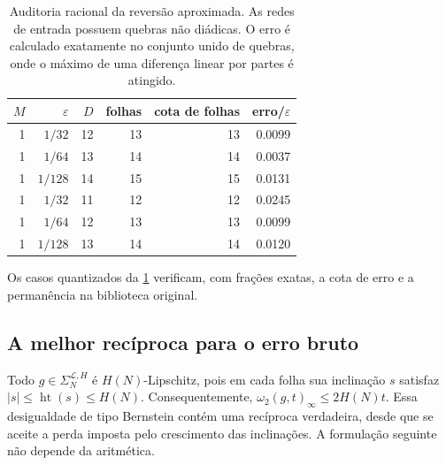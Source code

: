 \documentclass[11pt,a4paper]{article}
\theoremstyle{definition}
\theoremstyle{remark}
\newcommand{\Library}{\mathcal{L}}
\newcommand{\height}{\operatorname{ht}}
\begin{document}
\begin{table}[t]
 \centering
 \small
 \begin{tabular}{rrrrrr}
\toprule
$M$ & $\varepsilon$ & $D$ & folhas & cota de folhas & erro/$\varepsilon$\\
\midrule
1 & $1/32$ & 12 & 13 & 13 & 0.0099\\
1 & $1/64$ & 13 & 14 & 14 & 0.0037\\
1 & $1/128$ & 14 & 15 & 15 & 0.0131\\
1 & $1/32$ & 11 & 12 & 12 & 0.0245\\
1 & $1/64$ & 12 & 13 & 13 & 0.0099\\
1 & $1/128$ & 13 & 14 & 14 & 0.0120\\
\bottomrule
\end{tabular}

 \caption{Auditoria racional da reversão aproximada. As redes de entrada
 possuem quebras não diádicas. O erro é calculado exatamente no conjunto
 unido de quebras, onde o máximo de uma diferença linear por partes é
 atingido.}
 \label{tab:approximate-reverse-audit}
\end{table}

Os casos quantizados da \cref{tab:approximate-reverse-audit} verificam, com
frações exatas, a cota de erro e a permanência na biblioteca original.

\subsection{A melhor recíproca para o erro bruto}

Todo $g\in\Sigma_N^{\Library,H}$ é $H(N)$-Lipschitz, pois em cada folha sua
inclinação $s$ satisfaz $|s|\le\height(s)\le H(N)$. Consequentemente,
$\omega_2(g,t)_\infty\le2H(N)t$. Essa desigualdade de tipo Bernstein contém
uma recíproca verdadeira, desde que se aceite a perda imposta pelo crescimento
das inclinações. A formulação seguinte não depende da aritmética.
\end{document}
